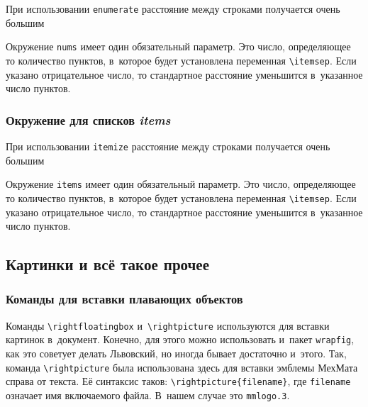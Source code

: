 \documentclass[a4paper]{article}
\begin{document}
\begin{nums}{-3}
\item При использовании \verb'enumerate' расстояние между строками получается очень большим
\item Окружение \verb'nums' имеет один обязательный параметр. Это число, определяющее
то количество пунктов, в~которое будет установлена переменная \verb'\itemsep'.
Если указано отрицательное число, то стандартное расстояние уменьшится
в~указанное число пунктов.
\end{nums}

\subsubsection{Окружение для списков \emph{items}}

\begin{items}{-3}
\item При использовании \verb'itemize' расстояние между строками получается очень большим
\item Окружение \verb'items' имеет один обязательный параметр. Это число, определяющее
то количество пунктов, в~которое будет установлена переменная \verb'\itemsep'.
Если указано отрицательное число, то стандартное расстояние уменьшится
в~указанное число пунктов.
\end{items}

\subsection{Картинки и всё такое прочее}

\subsubsection{Команды для вставки плавающих объектов}

\hangindent=-70pt
Команды \verb'\rightfloatingbox' и~\verb'\rightpicture' используются для вставки картинок
в~документ. Конечно, для этого можно использовать и~пакет \texttt{wrapfig}, как это советует
делать Львовский, но иногда бывает достаточно и~этого. Так, команда \verb'\rightpicture'
была использована здесь для вставки эмблемы МехМата справа от текста. Её синтаксис
таков: \verb'\rightpicture{filename}', где \verb'filename' означает имя включаемого файла.
В~нашем случае это \verb'mmlogo.3'.

\medskip
\end{document}
